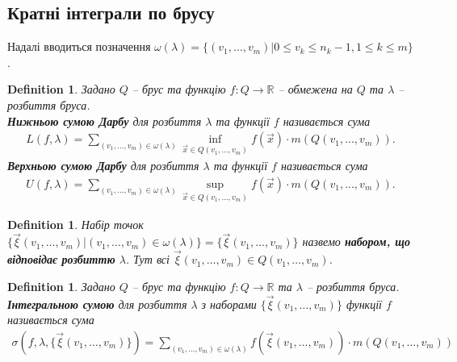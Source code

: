 \documentclass[a4paper, 10pt]{article}
\theoremstyle{theoremdd}
\theoremstyle{theoremdd}
\newtheorem{definition}[theorem]{Definition}
\theoremstyle{theoremdd}
\theoremstyle{theoremdd}
\theoremstyle{theoremdd}
\theoremstyle{theoremdd}
\theoremstyle{theoremdd}
\theoremstyle{theoremdd}
\begin{document}
\subsection{Кратні інтеграли по брусу}
Надалі вводиться позначення $\omega(\lambda) = \{ (v_1,\dots,v_m) | 0 \leq v_k \leq n_k-1, 1 \leq k \leq m \}$.

\begin{definition}
Задано $Q$ -- брус та функцію $f \colon Q \to \mathbb{R}$ -- обмежена на $Q$ та $\lambda$ -- розбиття бруса.\\
\textbf{Нижньою сумою Дарбу} для розбиття $\lambda$ та функції $f$ називається сума
\begin{align*}
L(f,\lambda) = \sum_{(v_1,\dots,v_m) \in \omega(\lambda)} \inf_{\vec{x} \in Q(v_1,\dots,v_m)} f(\vec{x}) \cdot m(Q(v_1,\dots,v_m)).
\end{align*}
\textbf{Верхньою сумою Дарбу} для розбиття $\lambda$ та функції $f$ називається сума
\begin{align*}
U(f,\lambda) = \sum_{(v_1,\dots,v_m) \in \omega(\lambda)} \sup_{\vec{x} \in Q(v_1,\dots,v_m)} f(\vec{x}) \cdot m(Q(v_1,\dots,v_m)).
\end{align*}
\end{definition}

\begin{definition}
Набір точок $\{ \vec{\xi}(v_1,\dots,v_m) | (v_1,\dots,v_m) \in \omega(\lambda) \} = \{ \vec{\xi} (v_1,\dots,v_m) \}$ назвемо \textbf{набором, що відповідає розбиттю} $\lambda$. Тут всі $\vec{\xi}(v_1,\dots,v_m) \in Q(v_1,\dots,v_m)$.
\end{definition}

\begin{definition}
Задано $Q$ -- брус та функцію $f \colon Q \to \mathbb{R}$ та $\lambda$ -- розбиття бруса.\\
\textbf{Інтегральною сумою} для розбиття $\lambda$ з наборами $\{ \vec{\xi}(v_1,\dots,v_m) \}$ функції $f$ називається сума
\begin{align*}
\sigma(f,\lambda, \{ \vec{\xi}(v_1,\dots,v_m) \}) = \sum_{(v_1,\dots,v_m) \in \omega(\lambda)} f(\vec{\xi}(v_1,\dots,v_m)) \cdot m(Q(v_1,\dots,v_m))
\end{align*}
\end{definition}

\iffalse
\begin{figure}[H]
\centering
\texttt{[image: RiemannSumR2.png]}
\end{figure}
\fi
\end{document}
